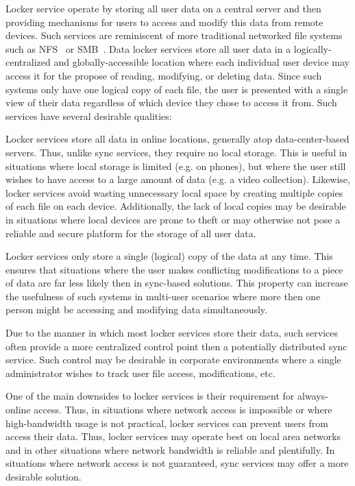 Locker service operate by storing all user data on a central server
and then providing mechanisms for users to access and modify this data
from remote devices. Such services are reminiscent of more traditional
networked file systems such as NFS~\cite{sandberg1985} or
SMB~\cite{microsoft-smb2}. Data locker services store all user data in
a logically-centralized and globally-accessible location where each
individual user device may access it for the propose of reading,
modifying, or deleting data. Since such systems only have one logical
copy of each file, the user is presented with a single view of their
data regardless of which device they chose to access it from. Such
services have several desirable qualities:

\begin{packed_desc}
\item[No Local Storage:] Locker services store all data in online
  locations, generally atop data-center-based servers. Thus, unlike
  sync services, they require no local storage. This is useful in
  situations where local storage is limited (e.g. on phones), but
  where the user still wishes to have access to a large amount of data
  (e.g. a video collection). Likewise, locker services avoid wasting
  unnecessary local space by creating multiple copies of each file on
  each device. Additionally, the lack of local copies may be desirable
  in situations where local devices are prone to theft or may
  otherwise not pose a reliable and secure platform for the storage of
  all user data.
\item[Single Source of Truth:] Locker services only store a single
  (logical) copy of the data at any time. This ensures that situations
  where the user makes conflicting modifications to a piece of data
  are far less likely then in sync-based solutions. This property can
  increase the usefulness of such systems in multi-user scenarios
  where more then one person might be accessing and modifying data
  simultaneously.
\item[Centralized Control:] Due to the manner in which most locker
  services store their data, such services often provide a more
  centralized control point then a potentially distributed sync
  service. Such control may be desirable in corporate environments
  where a single administrator wishes to track user file access,
  modifications, etc.
\end{packed_desc}

One of the main downsides to locker services is their requirement for
always-online access. Thus, in situations where network access is
impossible or where high-bandwidth usage is not practical, locker
services can prevent users from access their data. Thus, locker
services may operate best on local area networks and in other
situations where network bandwidth is reliable and plentifully. In
situations where network access is not guaranteed, sync services may
offer a more desirable solution.

